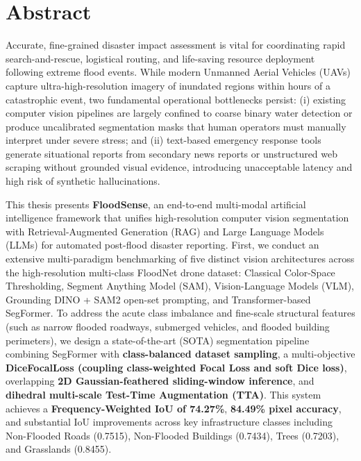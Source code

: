 \documentclass[a4paper, 12pt]{report}
\theoremstyle{definition}
\begin{document}
	\chapter*{Abstract}
	Accurate, fine-grained disaster impact assessment is vital for coordinating rapid search-and-rescue, logistical routing, and life-saving resource deployment following extreme flood events. While modern Unmanned Aerial Vehicles (UAVs) capture ultra-high-resolution imagery of inundated regions within hours of a catastrophic event, two fundamental operational bottlenecks persist: (i) existing computer vision pipelines are largely confined to coarse binary water detection or produce uncalibrated segmentation masks that human operators must manually interpret under severe stress; and (ii) text-based emergency response tools generate situational reports from secondary news reports or unstructured web scraping without grounded visual evidence, introducing unacceptable latency and high risk of synthetic hallucinations.

	This thesis presents \textbf{FloodSense}, an end-to-end multi-modal artificial intelligence framework that unifies high-resolution computer vision segmentation with Retrieval-Augmented Generation (RAG) and Large Language Models (LLMs) for automated post-flood disaster reporting. First, we conduct an extensive multi-paradigm benchmarking of five distinct vision architectures across the high-resolution multi-class FloodNet drone dataset: Classical Color-Space Thresholding, Segment Anything Model (SAM), Vision-Language Models (VLM), Grounding DINO + SAM2 open-set prompting, and Transformer-based SegFormer. To address the acute class imbalance and fine-scale structural features (such as narrow flooded roadways, submerged vehicles, and flooded building perimeters), we design a state-of-the-art (SOTA) segmentation pipeline combining SegFormer with \textbf{class-balanced dataset sampling}, a multi-objective \textbf{DiceFocalLoss (coupling class-weighted Focal Loss and soft Dice loss)}, overlapping \textbf{2D Gaussian-feathered sliding-window inference}, and \textbf{dihedral multi-scale Test-Time Augmentation (TTA)}. This system achieves a \textbf{Frequency-Weighted IoU of 74.27\%}, \textbf{84.49\% pixel accuracy}, and substantial IoU improvements across key infrastructure classes including Non-Flooded Roads (0.7515), Non-Flooded Buildings (0.7434), Trees (0.7203), and Grasslands (0.8455).
\end{document}
